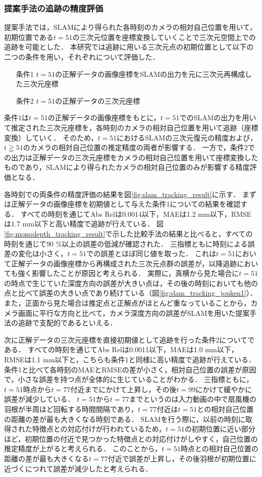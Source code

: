 \subsubsection{提案手法の追跡の精度評価}\label{subsubsec:3d_tracking_eval}
提案手法では，SLAMにより得られた各時刻のカメラの相対自己位置を用いて，初期位置である$t=51$の三次元位置を座標変換していくことで三次元空間上での追跡を可能とした．
本研究では追跡に用いる三次元点の初期位置として以下の二つの条件を用い，それぞれについて評価した．
\begin{itemize}
\item [条件1]$t=51$の正解データの画像座標をSLAMの出力を元に三次元再構成した三次元座標
\item [条件2]$t=51$の正解データの三次元座標
\end{itemize}
条件1は$t=51$の正解データの画像座標をもとに，$t=51$でのSLAMの出力を用いて推定された三次元座標を，各時刻のカメラの相対自己位置を用いて追跡（座標変換）していく．
そのため，$t=51$におけるSLAMの三次元復元の精度および，$t\geqq51$のカメラの相対自己位置の推定精度の両者が影響する．
一方で，条件2での出力は正解データの三次元座標をカメラの相対自己位置を用いて座標変換したものであり，SLAMにより得られたカメラの相対自己位置のみが影響する精度評価となる．

各時刻での両条件の精度評価の結果を図\ref{fig:slam_tracking_result}に示す．
まずは正解データの画像座標を初期値として与えた条件1についての結果を確認する．
すべての時刻を通じてAbs Relは0.0014以下，MAEは1.2 mm以下，RMSEは1.7 mm以下と高い精度で追跡が行えている．
図\ref{fig:monodepth_tracking_result}で示した比較手法の結果と比べると，すべての時刻を通じて90 \%以上の誤差の低減が確認された．
三指標ともに時刻による誤差の変化は小さく，$t=51$での誤差とほぼ同じ値を取った．
これは$t=51$において正解データの画像座標から再構成された三次元点群の誤差が，以降追跡においても強く影響したことが原因と考えられる．
実際に，真横から見た場合に$t=51$の時点で生じていた深度方向の誤差が大きい点は，その後の時刻においても他の点と比べて誤差の大きい点であり続けている（図\ref{fig:slam_tracking_jouken1}）．
また，正面から見た場合は推定点と正解点がほとんど重なっていることから，カメラ画面に平行な方向と比べて，カメラ深度方向の誤差がSLAMを用いた提案手法の追跡で支配的であるといえる．

次に正解データの三次元座標を直接初期値として追跡を行った条件2についてである．
すべての時刻を通じてAbs Relは0.0011以下，MAEは1.0 mm以下，RMSEは1.1 mm以下と，こちらも条件1と同様に高い精度で追跡が行えている．
条件1と比べて各時刻のMAEとRMSEの差が小さく，相対自己位置の誤差が原因で，小さな誤差を持つ点が全体的に生じていることがわかる．
三指標ともに，$t=51$時点から$t=77$付近までにかけて上昇し，その後$t=99$にかけて緩やかに誤差が減少している．
$t=51$から$t=77$までというのは入力動画の中で扇風機の羽根が半周ほど回転する時間間隔であり，$t=77$付近は$t=51$との相対自己位置の距離の差が最も大きくなる時刻である．
SLAMを行う際に，以前の時刻に取得された特徴点との対応付けが行われているため，$t=51$の初期位置に近い部分ほど，初期位置の付近で見つかった特徴点との対応付けがしやすく，自己位置の推定精度が上がると考えられる．
このことから，$t=51$時点との相対自己位置の距離の差が最も大きくなる$t=77$付近で誤差が上昇し，その後羽根が初期位置に近づくにつれて誤差が減少したと考えられる．

